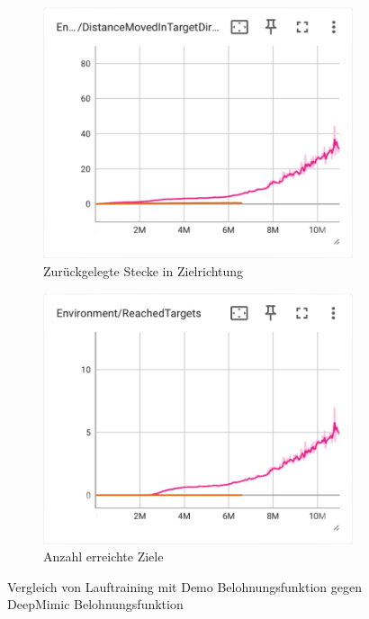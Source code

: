 \begin{figure}[H]
  \centering  
  \begin{subfigure}{.49\textwidth}
      \centering  
      \includegraphics[width=\textwidth]{img/116_127_move_target_dir}
      \caption{Zurückgelegte Stecke in Zielrichtung}
      \label{fig:116_127_move_target_dir}
    \end{subfigure}
    \begin{subfigure}{.49\textwidth}
      \centering  
      \includegraphics[width=\textwidth]{img/116_127_reach_target}
      \caption{Anzahl erreichte Ziele}
      \label{fig:116_127_reach_target}
    \end{subfigure}
  \caption{Vergleich von Lauftraining mit Demo Belohnungsfunktion gegen DeepMimic Belohnungsfunktion}
  \label{fig:versuch4_laufen_vergleich}
\end{figure}

